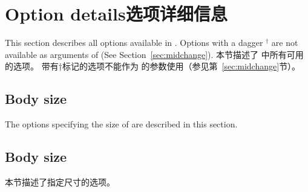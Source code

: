 \section{Option details\hfill 选项详细信息}
\begin{paracol}{2}
This section describes all options available in \Gm.
Options with a dagger $^\dagger$ are not available 
as arguments of  (See Section~\ref{sec:midchange}).
\switchcolumn
本节描述了 \Gm 中所有可用的选项。
带有†标记的选项不能作为  的参数使用（参见第~\ref{sec:midchange}节）。
\end{paracol}

% 
% 
 
\begin{paracol}{2}
\subsection{Body size}\label{sec:body}

The options specifying the size of  are described in this
section.
\switchcolumn
\subsection{Body size}
本节描述了指定尺寸的选项。
\end{paracol}

